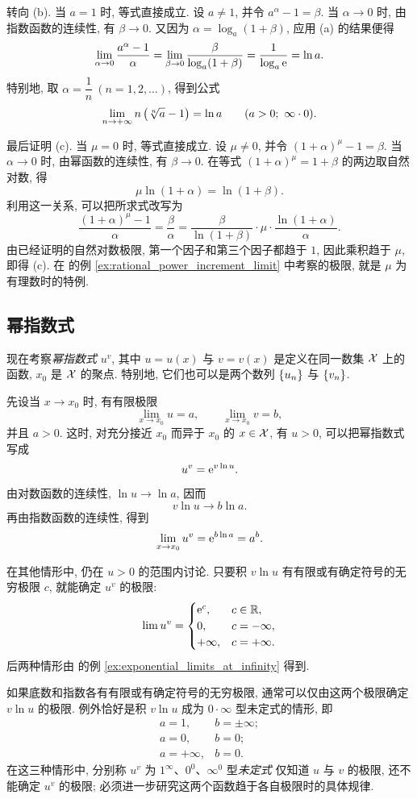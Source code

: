 转向 (b). 当 $a=1$ 时, 等式直接成立.
设 $a\neq1$, 并令 $a^\alpha-1=\beta$.
当 $\alpha\to0$ 时, 由指数函数的连续性, 有 $\beta\to0$.
又因为 $\alpha=\log_a(1+\beta)$, 应用 (a) 的结果便得
$$
\lim_{\alpha\to0}\frac{a^\alpha-1}{\alpha}
=\lim_{\beta\to0}\frac{\beta}{\log_a(1+\beta)}
=\frac1{\log_a\mathrm{e}}=\ln a.
$$
特别地, 取 $\alpha=\dfrac1n\ (n=1,2,\ldots)$, 得到公式
$$
\lim_{n\to+\infty}n\left( \sqrt[n]{a}-1 \right)=\ln a
\qquad(a>0;\ \infty\cdot0).
$$

最后证明 (c). 当 $\mu=0$ 时, 等式直接成立.
设 $\mu\neq0$, 并令 $(1+\alpha)^\mu-1=\beta$.
当 $\alpha\to0$ 时, 由幂函数的连续性, 有 $\beta\to0$.
在等式 $(1+\alpha)^\mu=1+\beta$ 的两边取自然对数, 得
$$
\mu\ln(1+\alpha)=\ln(1+\beta).
$$
利用这一关系, 可以把所求式改写为
$$
\frac{(1+\alpha)^\mu-1}{\alpha}
=\frac\beta\alpha
=\frac{\beta}{\ln(1+\beta)}\cdot\mu\cdot\frac{\ln(1+\alpha)}{\alpha}.
$$
由已经证明的自然对数极限, 第一个因子和第三个因子都趋于 $1$,
因此乘积趋于 $\mu$, 即得 (c).
在  的例 \ref{ex:rational_power_increment_limit} 中考察的极限,
就是 $\mu$ 为有理数时的特例.

\subsection{幂指数式}\label{subsec:78}
现在考察\emph{幂指数式} $u^v$,
其中 $u=u(x)$ 与 $v=v(x)$ 是定义在同一数集 $\mathcal{X}$ 上的函数, $x_0$ 是 $\mathcal{X}$ 的聚点.
特别地, 它们也可以是两个数列 $\{u_{n}\}$ 与 $\{v_{n}\}$.

先设当 $x\to x_0$ 时, 有有限极限
$$
\lim_{x\to x_0}u=a,\qquad \lim_{x\to x_0}v=b,
$$
并且 $a>0$. 这时, 对充分接近 $x_0$ 而异于 $x_0$ 的 $x\in\mathcal{X}$, 有 $u>0$,
可以把幂指数式写成
$$
u^v=\mathrm{e}^{v\ln u}.
$$
由对数函数的连续性, $\ln u\to\ln a$, 因而
$$
v\ln u\to b\ln a.
$$
再由指数函数的连续性, 得到
$$
\lim_{x\to x_0}u^v=\mathrm{e}^{b\ln a}=a^b.
$$

在其他情形中, 仍在 $u>0$ 的范围内讨论.
只要积 $v\ln u$ 有有限或有确定符号的无穷极限 $c$, 就能确定 $u^v$ 的极限:
$$
\lim u^v=
\begin{cases}
\mathrm{e}^c, & c\in\mathbb{R},\\
0, & c=-\infty,\\
+\infty, & c=+\infty.
\end{cases}
$$
后两种情形由  的例 \ref{ex:exponential_limits_at_infinity} 得到.

如果底数和指数各有有限或有确定符号的无穷极限, 通常可以仅由这两个极限确定 $v\ln u$ 的极限.
例外恰好是积 $v\ln u$ 成为 $0\cdot\infty$ 型未定式的情形, 即
$$
\begin{array}{lll}
a=1, & b=\pm\infty;\\
a=0, & b=0;\\
a=+\infty, & b=0.
\end{array}
$$
在这三种情形中, 分别称 $u^v$ 为
{\kaishu $1^\infty$、$0^0$、$\infty^0$ 型\emph{未定式}}
仅知道 $u$ 与 $v$ 的极限, 还不能确定 $u^v$ 的极限;
必须进一步研究这两个函数趋于各自极限时的具体规律.

